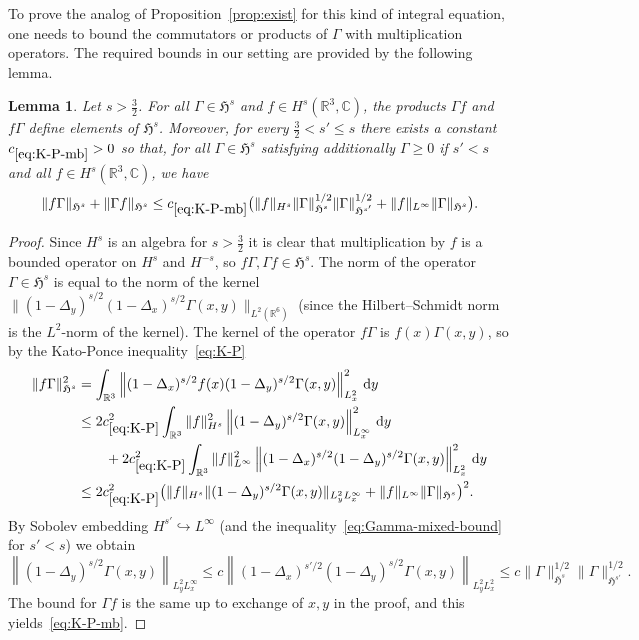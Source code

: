 \documentclass[10pt]{amsart}
\newtheorem{lemm}[theo]{Lemma}\newtheorem{prop}[theo]{Proposition}\newtheorem{coro}[theo]{Corollary}\newtheorem{conj}[theo]{Conjecture}
\theoremstyle{definition}\newtheorem{defi}[theo]{Definition}\newtheorem{rema}[theo]{Remark}\newtheorem{exam}[theo]{Example}\newtheorem{exem}[theo]{Example}\newtheorem{nota}[theo]{Notation}
\newcommand\R{\mathbb{R}}
\newcommand\C{\mathbb{C}}
\newcommand{\gH}{\mathfrak{H}}
\renewcommand\d[1]{{\ensuremath{\,\text{d}#1}}}
\begin{document}
To prove the analog of Proposition~\ref{prop:exist} for this kind of integral equation, one needs to bound the commutators or products of $\Gamma$ with multiplication operators. The required bounds in our setting are provided by the following lemma.

\begin{lemm}\label{lem:K-P-mb}
Let $s>\tfrac32$. For all $\Gamma\in \gH^s$ and $f\in H^s(\R^3, \C)$, the products $\Gamma f$ and $f\Gamma$ define elements of $ \gH^s$. Moreover, for every $\tfrac32<s'\leq s$ there exists a constant $c_{\eqref{eq:K-P-mb}}>0$ so that, for all $\Gamma\in \gH^s$ satisfying additionally $\Gamma \geq 0$ if $s'<s$ and all $f\in H^s(\R^3, \C)$, we have
\begin{equation}\label{eq:K-P-mb}
\| f\Gamma \|_{\gH^s} + \| \Gamma f\|_{\gH^s}\leq c_{\eqref{eq:K-P-mb}} \big(\|f\|_{H^s} \|\Gamma\|_{\gH^s}^{1/2} \|\Gamma\|_{\gH^{s'}}^{1/2} + \|f\|_{L^\infty} \|\Gamma\|_{\gH^s} \big).
\end{equation}
\end{lemm}

\begin{proof}
Since $H^s$ is an algebra for $s>\tfrac32$ it is clear that multiplication by $f$ is a bounded operator on $H^s$ and $H^{-s}$, so $f\Gamma, \Gamma f \in \gH^s$. The norm of the operator $\Gamma\in \gH^s$ is equal to the norm of the kernel $\|(1-\Delta_y)^{s/2}(1-\Delta_x)^{s/2}\Gamma(x,y)\|_{L^2(\R^6)}$ (since the Hilbert--Schmidt norm is the $L^2$-norm of the kernel). The kernel of the operator $f\Gamma$ is $f(x)\Gamma(x,y)$, so by the Kato-Ponce inequality~\eqref{eq:K-P}
\begin{align*}
\| f\Gamma \|_{\gH^s}^2 & = \int_{\R^3} \left\|(1-\Delta_x)^{s/2}f(x)(1-\Delta_y)^{s/2}\Gamma(x,y)\right\|_{L^2_x}^2 \d y\\
&\leq 2c_{\eqref{eq:K-P}}^2 \int_{\R^3}\|f\|_{H^s}^2 \left\|(1-\Delta_y)^{s/2}\Gamma(x,y)\right\|_{L^\infty_x}^2 \d y \\
&\qquad + 2c_{\eqref{eq:K-P}}^2 \int_{\R^3}\|f\|_{L^\infty}^2\left\|(1-\Delta_x)^{s/2}(1-\Delta_y)^{s/2}\Gamma(x,y)\right\|_{L^2_x}^2 \d y \\
&\leq 2c_{\eqref{eq:K-P}}^2 \big(\|f\|_{H^s} \|(1-\Delta_y)^{s/2}\Gamma(x,y)\|_{L^2_yL^\infty_x} + \|f\|_{L^\infty} \|\Gamma\|_{\gH^s} \big)^2.
\end{align*}
By Sobolev embedding $H^{s'}\hookrightarrow L^\infty$ (and the inequality~\eqref{eq:Gamma-mixed-bound} for $s'<s$) we obtain
\begin{equation*}
\left\|(1-\Delta_y)^{s/2}\Gamma(x,y)\right\|_{L^2_yL^\infty_x} \leq c \left\|(1-\Delta_x)^{s'/2}(1-\Delta_y)^{s/2}\Gamma(x,y)\right\|_{L^2_yL^2_x} \leq c \|\Gamma\|_{\gH^s}^{1/2} \|\Gamma\|_{\gH^{s'}}^{1/2}.
\end{equation*}
The bound for $\Gamma f$ is the same up to exchange of $x, y$ in the proof, and this yields~\eqref{eq:K-P-mb}.
\end{proof}
\end{document}

